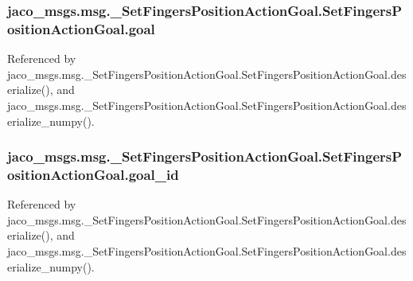 \subsubsection[{\texorpdfstring{goal}{goal}}]{\setlength{\rightskip}{0pt plus 5cm}jaco\+\_\+msgs.\+msg.\+\_\+\+Set\+Fingers\+Position\+Action\+Goal.\+Set\+Fingers\+Position\+Action\+Goal.\+goal}\hypertarget{classjaco__msgs_1_1msg_1_1__SetFingersPositionActionGoal_1_1SetFingersPositionActionGoal_a6914ac9af1a3f57743ec45d16f637698}{}\label{classjaco__msgs_1_1msg_1_1__SetFingersPositionActionGoal_1_1SetFingersPositionActionGoal_a6914ac9af1a3f57743ec45d16f637698}


Referenced by jaco\+\_\+msgs.\+msg.\+\_\+\+Set\+Fingers\+Position\+Action\+Goal.\+Set\+Fingers\+Position\+Action\+Goal.\+deserialize(), and jaco\+\_\+msgs.\+msg.\+\_\+\+Set\+Fingers\+Position\+Action\+Goal.\+Set\+Fingers\+Position\+Action\+Goal.\+deserialize\+\_\+numpy().

\subsubsection[{\texorpdfstring{goal\+\_\+id}{goal_id}}]{\setlength{\rightskip}{0pt plus 5cm}jaco\+\_\+msgs.\+msg.\+\_\+\+Set\+Fingers\+Position\+Action\+Goal.\+Set\+Fingers\+Position\+Action\+Goal.\+goal\+\_\+id}\hypertarget{classjaco__msgs_1_1msg_1_1__SetFingersPositionActionGoal_1_1SetFingersPositionActionGoal_a8336121df2ce21765eb1e1e965fc01e5}{}\label{classjaco__msgs_1_1msg_1_1__SetFingersPositionActionGoal_1_1SetFingersPositionActionGoal_a8336121df2ce21765eb1e1e965fc01e5}


Referenced by jaco\+\_\+msgs.\+msg.\+\_\+\+Set\+Fingers\+Position\+Action\+Goal.\+Set\+Fingers\+Position\+Action\+Goal.\+deserialize(), and jaco\+\_\+msgs.\+msg.\+\_\+\+Set\+Fingers\+Position\+Action\+Goal.\+Set\+Fingers\+Position\+Action\+Goal.\+deserialize\+\_\+numpy().

